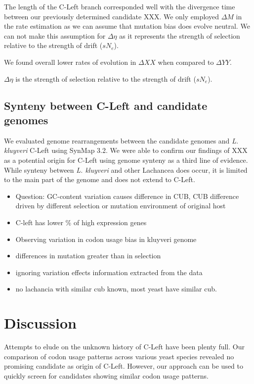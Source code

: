 \documentclass[12pt,draft]{article}
\begin{document}
The length of the C-Left branch corresponded well with the divergence time between our previously determined candidate XXX. 
We only employed $\Delta M$ in the rate estimation as we can assume that mutation bias does evolve neutral.
We can not make this assumption for $\Delta \eta$ as it represents the strength of selection relative to the strength of drift ($sN_e$).


We found overall lower rates of evolution in $\Delta XX$ when compared to $\Delta YY$. 



$\Delta \eta$ is the strength of selection relative to the strength of drift ($sN_e$).

\subsection*{Synteny between C-Left and candidate genomes}

We evaluated genome rearrangements between the candidate genomes and \textit{L. kluyveri} C-Left using SynMap 3.2.
We were able to confirm our findings of XXX as a potential origin for C-Left using genome synteny as a third line of evidence.
While synteny between \textit{L. kluyveri} and other Lachancea does occur, it is limited to the main part of the genome and does not extend to C-Left.

\begin{itemize}
	\item Question: GC-content variation causes difference in CUB, CUB difference driven by different selection or mutation environment of original host
	\item C-left has lower \% of high expression genes
	\item Observing variation in codon usage bias in kluyveri genome
	\item differences in mutation greater than in selection
	\item ignoring variation effects information extracted from the data
	\item no lachancia with similar cub known, most yeast have similar cub.
\end{itemize}

\section*{Discussion}

Attempts to elude on the unknown history of C-Left have been plenty full. 
Our comparison of codon usage patterns across various yeast species revealed no promising candidate as origin of C-Left.
However, our approach can be used to quickly screen for candidates showing similar codon usage patterns.
\end{document}
